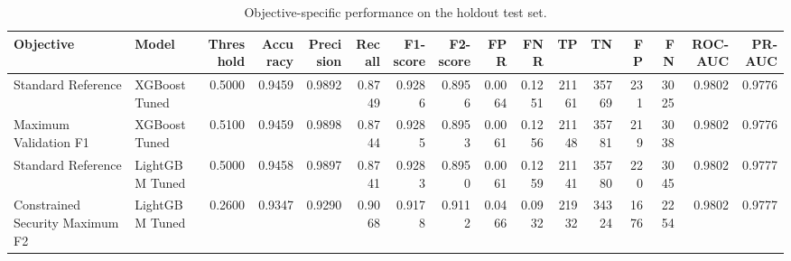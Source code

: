 \begin{table}
\caption{Objective-specific performance on the holdout test set.}
\label{tab:holdout_results}
\begin{tabular}{llrrrrrrrrrrrrrr}
\toprule
Objective & Model & Threshold & Accuracy & Precision & Recall & F1-score & F2-score & FPR & FNR & TP & TN & FP & FN & ROC-AUC & PR-AUC \\
\midrule
Standard Reference & XGBoost Tuned & 0.5000 & 0.9459 & 0.9892 & 0.8749 & 0.9286 & 0.8956 & 0.0064 & 0.1251 & 21161 & 35769 & 231 & 3025 & 0.9802 & 0.9776 \\
Maximum Validation F1 & XGBoost Tuned & 0.5100 & 0.9459 & 0.9898 & 0.8744 & 0.9285 & 0.8953 & 0.0061 & 0.1256 & 21148 & 35781 & 219 & 3038 & 0.9802 & 0.9776 \\
Standard Reference & LightGBM Tuned & 0.5000 & 0.9458 & 0.9897 & 0.8741 & 0.9283 & 0.8950 & 0.0061 & 0.1259 & 21141 & 35780 & 220 & 3045 & 0.9802 & 0.9777 \\
Constrained Security Maximum F2 & LightGBM Tuned & 0.2600 & 0.9347 & 0.9290 & 0.9068 & 0.9178 & 0.9112 & 0.0466 & 0.0932 & 21932 & 34324 & 1676 & 2254 & 0.9802 & 0.9777 \\
\bottomrule
\end{tabular}
\end{table}
